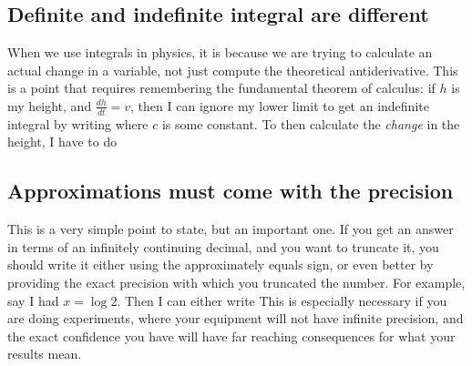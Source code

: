 \documentclass{article}
\begin{document}
\subsection{Definite and indefinite integral are different}
When we use integrals in physics, it is because we are trying to calculate an actual change in a variable, not just compute the theoretical antiderivative. This is a point that requires remembering the fundamental theorem of calculus: if $h$ is my height, and $\frac{dh}{dt} = v$, then 
I can ignore my lower limit to get an indefinite integral by writing 
where $c$ is some constant. To then calculate the \emph{change} in the height, I have to do 

\subsection{Approximations must come with the precision}
This is a very simple point to state, but an important one. If you get an answer in terms of an infinitely continuing decimal, and you want to truncate it, you should write it either using the approximately equals sign, or even better by providing the exact precision with which you truncated the number. For example, say I had $x = \log 2$. Then I can either write 
This is especially necessary if you are doing experiments, where your equipment will not have infinite precision, and the exact confidence you have will have far reaching consequences for what your results mean. 

\end{document}
